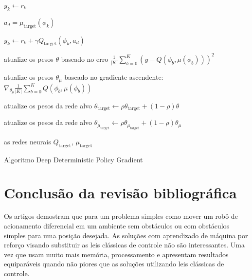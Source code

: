 \begin{algorithm}[H]
{{{{{                        $y_k \leftarrow r_k$
                      }
                      {
                        $a_d = \mu_{\text{target}}(\phi_k)$
    
                        $y_k \leftarrow r_k + \gamma Q_{\text{target}}(\phi_k,a_d)$
                      }
                    
                }

                atualize os pesos $\theta$ baseado no erro  $\frac{1}{|K|} \sum_{b =0}^{K} (y -Q(\phi_b,\mu(\phi_b)))^2$
                
                atualize os pesos $\theta_\mu$ baseado no gradiente ascendente:
                $\nabla_{\theta_\mu} \frac{1}{|K|} \sum_{b =0}^{K} Q(\phi_b,\mu(\phi_b))$
            
            }

           
        }

        atualize os pesos da rede alvo $\theta_{\text{target}}  \leftarrow \rho \theta_{\text{target}}  + (1-\rho) \theta$

        atualize os pesos da rede alvo $\theta_{\mu_{\text{target}}}  \leftarrow \rho \theta_{\mu_{\text{target}}}  + (1-\rho)\theta_\mu$

        
    }
    \Retorna as redes neurais $Q_{\text{target}}$, $\mu_{\text{target}}$
    \caption{Algoritmo Deep Deterministic Policy Gradient}
    \label{Deep Deterministic Policy Gradient:}
\end{algorithm}


\section{Conclusão da revisão bibliográfica}
\label{sec:conclusao:revisao:bibliografica}
Os artigos demostram que para um problema simples como mover
um robô de acionamento diferencial em um ambiente sem obstáculos ou com
obstáculos simples para uma posição desejada. As soluções com aprendizado de máquina por reforço
visando substituir as leis clássicas de controle não são interessantes. Uma vez que  usam muito mais
memória, processamento e apresentam resultados equiparáveis quando não
piores que as soluções utilizando leis clássicas de controle. 